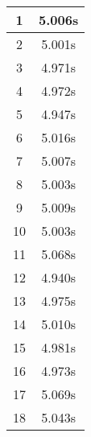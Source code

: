 \documentclass[11pt]{article}
\begin{document}
\begin{table}[!h]
\begin{center}
\begin{minipage}{0.48\textwidth}
\begin{tabular}{| c | c |}
				1 & 5.006s \\ \hline
				2 & 5.001s \\ \hline
				3 & 4.971s \\ \hline
				4 & 4.972s \\ \hline
				5 & 4.947s \\ \hline
				6 & 5.016s \\ \hline
				7 & 5.007s \\ \hline
				8 & 5.003s \\ \hline
				9 & 5.009s \\ \hline
				10 & 5.003s \\ \hline
				11 & 5.068s \\ \hline
				12 & 4.940s \\ \hline
				13 & 4.975s \\ \hline
				14 & 5.010s \\ \hline
				15 & 4.981s \\ \hline
				16 & 4.973s \\ \hline
				17 & 5.069s \\ \hline
				18 & 5.043s \\ \hline
			\end{tabular}
		\end{minipage}
	\end{center}
\end{table}

\pagebreak
\end{document}
